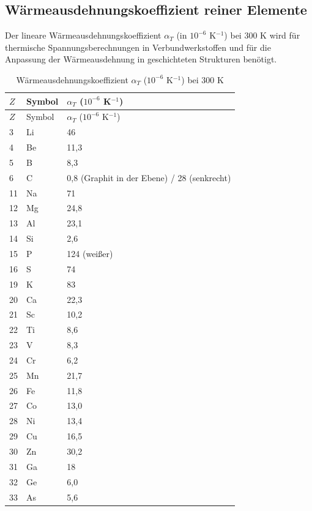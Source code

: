 \documentclass[12pt,a4paper]{article}
\begin{document}
	\subsection{Wärmeausdehnungskoeffizient reiner Elemente}
	\label{subsec:thermal-expansion}
	
	Der lineare Wärmeausdehnungskoeffizient \(\alpha_T\) (in \(10^{-6}\) K\(^{-1}\)) bei 300 K wird für thermische Spannungsberechnungen in Verbundwerkstoffen und für die Anpassung der Wärmeausdehnung in geschichteten Strukturen benötigt.
	
	\begin{longtable}{p{0.6cm}p{1.2cm}p{1.5cm}}
		\caption{Wärmeausdehnungskoeffizient \(\alpha_T\) (\(10^{-6}\) K\(^{-1}\)) bei 300 K} \label{tab:thermal-expansion-all} \\
		\toprule
		\(Z\) & Symbol & \(\alpha_T\) (\(10^{-6}\) K\(^{-1}\)) \\
		\midrule
		\endfirsthead
		\toprule
		\(Z\) & Symbol & \(\alpha_T\) (\(10^{-6}\) K\(^{-1}\)) \\
		\midrule
		\endhead
		3  & Li & 46 \\
		4  & Be & 11,3 \\
		5  & B  & 8,3 \\
		6  & C  & 0,8 (Graphit in der Ebene) / 28 (senkrecht) \\
		11 & Na & 71 \\
		12 & Mg & 24,8 \\
		13 & Al & 23,1 \\
		14 & Si & 2,6 \\
		15 & P  & 124 (weißer) \\
		16 & S  & 74 \\
		19 & K  & 83 \\
		20 & Ca & 22,3 \\
		21 & Sc & 10,2 \\
		22 & Ti & 8,6 \\
		23 & V  & 8,3 \\
		24 & Cr & 6,2 \\
		25 & Mn & 21,7 \\
		26 & Fe & 11,8 \\
		27 & Co & 13,0 \\
		28 & Ni & 13,4 \\
		29 & Cu & 16,5 \\
		30 & Zn & 30,2 \\
		31 & Ga & 18 \\
		32 & Ge & 6,0 \\
		33 & As & 5,6 \\

\end{longtable}
\end{document}
